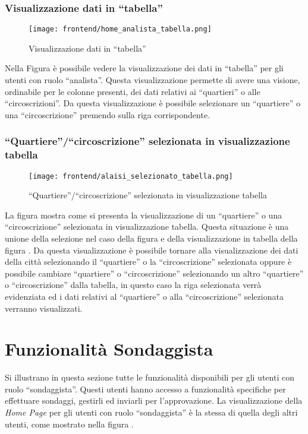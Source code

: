     \subsubsection{Visualizzazione dati in ``tabella''}
        \begin{figure}[H]
            \centering
            \texttt{[image: frontend/home\_analista\_tabella.png]}
            \caption{Visualizzazione dati in ``tabella''}
            \label{fig:frontend-analista-tabella}
        \end{figure}
        Nella Figura  è possibile vedere la visualizzazione dei dati in ``tabella'' per gli utenti con ruolo ``analista''. Questa visualizzazione permette di avere una visione, ordinabile per le colonne presenti, dei dati relativi ai ``quartieri'' o alle ``circoscrizioni''. Da questa visualizzazione è possibile selezionare un ``quartiere'' o una ``circoscrizione'' premendo sulla riga corrispondente. 
    \subsubsection{``Quartiere''/``circoscrizione'' selezionata in visualizzazione tabella}
        \begin{figure}[H]
            \centering
            \texttt{[image: frontend/alaisi\_selezionato\_tabella.png]}
            \caption{``Quartiere''/``circoscrizione'' selezionata in visualizzazione tabella}
            \label{fig:frontend-analista-tabella-selezionato}
        \end{figure}
        La figura  mostra come si presenta la visualizzazione di un ``quartiere'' o una ``circoscrizione'' selezionata in visualizzazione tabella. Questa situazione è una unione della selezione nel caso della figura  e della visualizzazione in tabella della figura . Da questa visualizzazione è possibile tornare alla visualizzazione dei dati della città selezionando il ``quartiere'' o la ``circoscrizione'' selezionata oppure è possibile cambiare ``quartiere'' o ``circoscrizione'' selezionando un altro ``quartiere'' o ``circoscrizione'' dalla tabella, in questo caso la riga selezionata verrà evidenziata ed i dati relativi al ``quartiere'' o alla ``circoscrizione'' selezionata verranno visualizzati.
\section{Funzionalità Sondaggista}
    Si illustrano in questa sezione tutte le funzionalità disponibili per gli utenti con ruolo ``sondaggista''. Questi utenti hanno accesso a funzionalità specifiche per effettuare sondaggi, gestirli ed inviarli per l'approvazione. La visualizzazione della \textit{Home Page} per gli utenti con ruolo ``sondaggista'' è la stessa di quella degli altri utenti, come mostrato nella figura .
